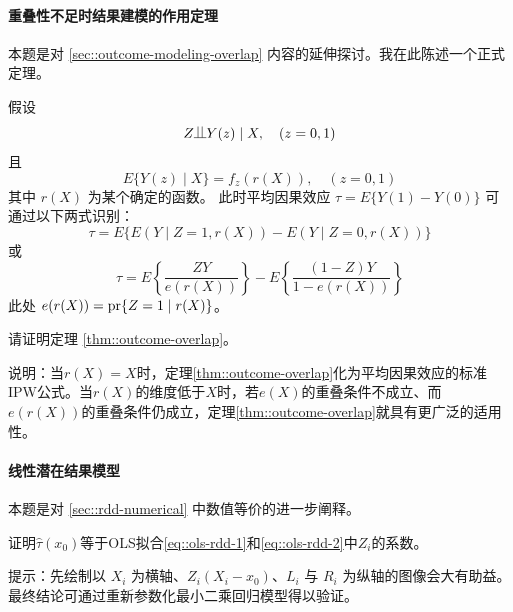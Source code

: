 \paragraph{重叠性不足时结果建模的作用定理}\label{hw::outcome-modeling-overlap}

本题是对 \ref{sec::outcome-modeling-overlap} 内容的延伸探讨。我在此陈述一个正式定理。

\begin{theorem}
\label{thm::outcome-overlap}
假设 
$$
Z\ind Y(z) \mid X, \quad (z=0,1)
$$
且
$$
E\{  Y(z) \mid X \} = f_z( r(X)   ),\quad (z=0,1)
$$
其中 $r(X)$ 为某个确定的函数。  
此时平均因果效应 $\tau = E\{ Y(1) - Y(0)  \}$ 可通过以下两式识别：
$$
\tau =E\{   E(Y\mid Z=1, r(X)) - E(Y\mid Z=0, r(X)) \} 
$$
或
$$
\tau = E\left\{   \frac{ZY}{  e(r(X)) }  \right\}  - E\left\{   \frac{(1-Z)Y}{ 1 -  e(r(X)) }  \right\}
$$
此处 $e(r(X)) = \textup{pr}\{ Z=1\mid r(X) \}$。 
\end{theorem}

请证明定理 \ref{thm::outcome-overlap}。

说明：当$r(X) = X$时，定理\ref{thm::outcome-overlap}化为平均因果效应的标准IPW公式。当$r(X)$的维度低于$X$时，若$e(X)$的重叠条件不成立、而$e(r(X)) $的重叠条件仍成立，定理\ref{thm::outcome-overlap}就具有更广泛的适用性。 




 \paragraph{线性潜在结果模型}\label{hw::rdd-ols-fits}
 
 
 本题是对 \ref{sec::rdd-numerical} 中数值等价的进一步阐释。 
 
 证明$\hat\tau(x_0) $等于OLS拟合\eqref{eq::ols-rdd-1}和\eqref{eq::ols-rdd-2}中$Z_i$的系数。 
 


提示：先绘制以 $X_i$ 为横轴、$Z_i(X_i - x_0)$、$L_i$ 与 $R_i$ 为纵轴的图像会大有助益。最终结论可通过重新参数化最小二乘回归模型得以验证。 



